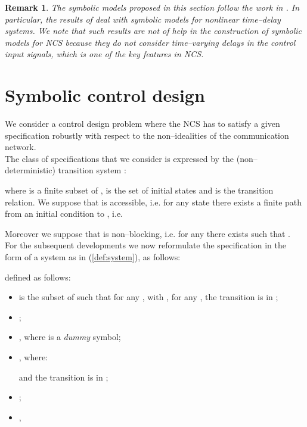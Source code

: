 \documentclass{amsart}
\newtheorem{remark}[theorem]{Remark}
\begin{document}
\begin{remark}
The symbolic models proposed in this section follow the work in \cite{PolaAutom2008,PolaSIAM2009,PolaSCL10,PolaTAC12,MajidTAC11}. In particular, the results of \cite{PolaSCL10} deal with symbolic models for nonlinear time--delay systems. We note that such results are not of help in the construction of symbolic models for NCS because they do not consider time--varying delays in the control input signals, which is one of the key features in NCS. 
\end{remark}

\section{Symbolic control design}\label{sec:control}
We consider a control design problem where the NCS  has to satisfy a given specification robustly with respect to the non--idealities of the communication network. \\
The class of specifications that we consider is expressed by the (non--deterministic) transition system \cite{ModelChecking}: 

where  is a finite subset of ,  is the set of initial states and   is the transition relation. We suppose that  is accessible, i.e. for any state  there exists a finite path from an initial condition  to , i.e.

Moreover we suppose that  is non--blocking, i.e. for any  there exists  such that . 
For the subsequent developments we now reformulate the specification  in the form of a system as in (\ref{def:system}), as follows:

defined as follows:

\begin{itemize}
\item  is the subset of  such that for any , with , for any , the transition  is in ;

\item ;

\item , where  is a \emph{dummy} symbol;

\item , where:

and the transition  is in ;

\item ;

\item ,

\end{itemize}
\end{document}
